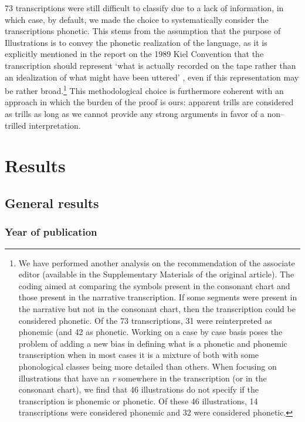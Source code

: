 73 transcriptions were still difficult to classify due to a lack of information, in which case, by default, we made the choice to systematically consider the transcriptions phonetic. This stems from the assumption that the purpose of Illustrations is to convey the phonetic realization of the language, as it is explicitly mentioned in the report on the 1989 Kiel Convention that the transcription should represent ‘what is actually recorded on the tape rather than an idealization of what might have been uttered’ \parencite[77]{roachReport1989Kiel1989}, even if this representation may be rather broad.\footnote{We have performed another analysis on the recommendation of the associate editor (available in the Supplementary Materials of the original article). The coding aimed at comparing the symbols present in the consonant chart and those present in the narrative transcription. If some segments were present in the narrative but not in the consonant chart, then the transcription could be considered phonetic. Of the 73 transcriptions, 31 were reinterpreted as phonemic (and 42 as phonetic. Working on a case by case basis poses the problem of adding a new bias in defining what is a phonetic and phonemic transcription when in most cases it is a mixture of both with some phonological classes being more detailed than others. When focusing on illustrations that have an \textit{r} somewhere in the transcription (or in the consonant chart), we find that 46 illustrations do not specify if the transcription is phonemic or phonetic. Of these 46 illustrations, 14 transcriptions were considered phonemic and 32 were considered phonetic.} This methodological choice is furthermore coherent with an approach in which the burden of the proof is ours: apparent trills are considered as trills as long as we cannot provide any strong arguments in favor of a non–trilled interpretation. 

\section{Results}

\subsection{General results}

\subsubsection{Year of publication}

